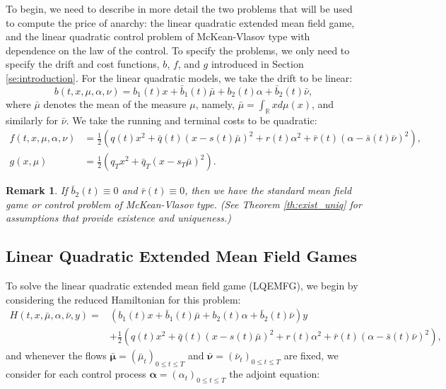 \documentclass[11pt]{article}
\newtheorem{remark}{Remark}
\def\balpha{\boldsymbol{\alpha}}
\def\bmubar{\boldsymbol{\bar{\mu}}}
\def\bnubar{\boldsymbol{\bar{\nu}}}
\begin{document}
To begin, we need to describe in more detail the two problems that will be used to compute the price of anarchy: the linear quadratic extended mean field game, and the linear quadratic control problem of McKean-Vlasov type with dependence on the law of the control. To specify the problems, we only need to specify the drift and cost functions, $b$, $f$, and $g$ introduced in Section \ref{se:introduction}. For the linear quadratic models, we take the drift to be linear:
\begin{equation*}
    b(t,x,\mu,\alpha,\nu)=b_1(t)x+\bar{b}_1(t) \bar{\mu}+b_2(t) \alpha+\bar{b}_2(t) \bar{\nu},
\end{equation*}
where $\bar{\mu}$ denotes the mean of the measure $\mu$, namely, $\bar{\mu}=\int_{\mathbb{R}}xd\mu(x)$, and similarly for $\bar{\nu}$. We take the running and terminal costs to be quadratic:
\begin{equation*}
\begin{split}
    f(t,x,\mu,\alpha,\nu)&=\frac{1}{2}\left(q(t)x^2+\bar{q}(t)(x-s(t)\bar{\mu})^2 +r(t)\alpha^2+\bar{r}(t)(\alpha-\bar{s}(t)\bar{\nu})^2\right), \\
    g(x,\mu)&=\frac{1}{2}\left(q_T x^2+\bar{q}_T (x-s_T \bar{\mu})^2\right).
\end{split}
\end{equation*}
\begin{remark}
If $\bar{b}_2(t)\equiv0$ and $\bar{r}(t)\equiv0$, then we have the standard mean field game or control problem of McKean-Vlasov type. (See Theorem \ref{th:exist_uniq} for assumptions that provide existence and uniqueness.)
\end{remark}

\subsection{\textbf{Linear Quadratic Extended Mean Field Games}}\label{sec:EMFG}
To solve the linear quadratic extended mean field game (LQEMFG), we begin by considering the reduced Hamiltonian for this problem:
\begin{equation*}
\begin{split}
    H(t,x,\bar{\mu},\alpha,\bar{\nu},y)=&(b_1(t)x+\bar{b}_1(t)\bar{\mu}+b_2(t) \alpha+\bar{b}_2(t)\bar{\nu})y \\
    &+\frac{1}{2}\left(q(t)x^2+\bar{q}(t)(x-s(t)\bar{\mu})^2 +r(t)\alpha^2+\bar{r}(t)(\alpha-\bar{s}(t)\bar{\nu})^2\right),
\end{split}
\end{equation*}
and whenever the flows $\bmubar=(\bar{\mu}_t)_{0\leq t\leq T}$ and $\bnubar=(\bar{\nu}_t)_{0\leq t\leq T}$ are fixed, we consider for each control process $\balpha=(\alpha_t)_{0\leq t\leq T}$ the adjoint equation:
\end{document}
